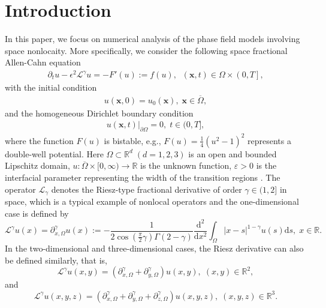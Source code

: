 \documentclass{siamart171218}
\numberwithin{theorem}{section}
\numberwithin{equation}{section}
\newcommand{\vecx}{\boldsymbol{x}}
\begin{document}
\section{Introduction}\label{sec: introduction}
In this paper, we focus on numerical analysis of the phase field models involving space nonlocaity.
More specifically,
we consider the following space fractional Allen-Cahn equation
\begin{equation}\label{eq.1.1}
\begin{aligned}\displaystyle
\partial_tu-\epsilon^2\mathscr{L}^\gamma u
=-F'(u):=f(u),\;\;(\vecx,t)\in\Omega\times\left(0,T\right],
\end{aligned}
\end{equation}
with the initial condition
\begin{equation*}
\begin{aligned}\displaystyle
u(\vecx,0)=u_0(\vecx),\;\vecx\in\overline{\Omega},
\end{aligned}
\end{equation*}
and the homogeneous Dirichlet boundary condition
\begin{equation*}
\begin{aligned}\displaystyle
u(\vecx,t)|_{\partial\Omega}=0,\;t\in(0,T],
\end{aligned}
\end{equation*}
where the function $F(u)$ is bistable, e.g.,
$F(u)=\frac{1}{4}\left(u^2-1\right)^2$ represents a double-well potential. Here
$\Omega\subset \mathds{R}^d \; (d = 1, 2, 3)$ is an open and bounded Lipschitz domain,
$u : \overline{\Omega} \times [0,\infty) \rightarrow \mathds{R}$ is the unknown function,
$\varepsilon > 0$ is the interfacial parameter representing
the width of the transition regions \cite{Nec2008}.
The operator $\mathcal{L}_\gamma$ denotes the Riesz-type fractional derivative of order
$\gamma\in(1,2]$ in space, which is a typical example of nonlocal operators and
the one-dimensional case is defined by \cite{Podlubny1999}
\begin{equation}\label{eq.1.2}
\displaystyle
\mathcal{L}^\gamma u(x)=\partial^\gamma_{x,\Omega} u(x):=
-\frac{1}{2\cos\left(\frac{\pi}{2}\gamma\right)\Gamma\left(2-\gamma\right)}
\frac{\mathrm{d}^2}{\mathrm{d}x^2}
\int_{\Omega}|x-s|^{1-\gamma}u\left(s\right)\mathrm{d}s,\;x\in\mathds{R}.
\end{equation}
In the two-dimensional and three-dimensional cases, the Riesz derivative
 can also be defined similarly, that is,
\begin{equation*}
\displaystyle
\mathcal{L}^\gamma u(x,y)=
\left(\partial^\gamma_{x,\Omega}+\partial^\gamma_{y,\Omega}\right)u(x,y),
\;(x,y)\in\mathds{R}^2,
\end{equation*}
and
\begin{equation*}
\displaystyle
\mathcal{L}^\gamma u(x,y,z)=
\left(\partial^\gamma_{x,\Omega}+\partial^\gamma_{y,\Omega}+
\partial^\gamma_{z,\Omega}
\right)u(x,y,z),\;(x,y,z)\in\mathds{R}^3.
\end{equation*}
\end{document}
